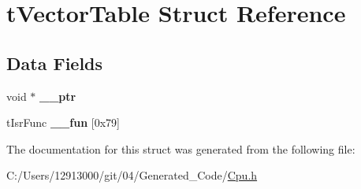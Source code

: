 \hypertarget{structt_vector_table}{}\section{t\+Vector\+Table Struct Reference}
\label{structt_vector_table}
\subsection*{Data Fields}
\begin{DoxyCompactItemize}
\item 
\hypertarget{structt_vector_table_a324d365e9c8c6c033f4edbc906f94844}{}void $\ast$ {\bfseries \+\_\+\+\_\+ptr}\label{structt_vector_table_a324d365e9c8c6c033f4edbc906f94844}

\item 
\hypertarget{structt_vector_table_a6001c7c57c392674cadaf831203e4606}{}t\+Isr\+Func {\bfseries \+\_\+\+\_\+fun} \mbox{[}0x79\mbox{]}\label{structt_vector_table_a6001c7c57c392674cadaf831203e4606}

\end{DoxyCompactItemize}


The documentation for this struct was generated from the following file\+:\begin{DoxyCompactItemize}
\item 
C\+:/\+Users/12913000/git/04/\+Generated\+\_\+\+Code/\hyperlink{_cpu_8h}{Cpu.\+h}\end{DoxyCompactItemize}
